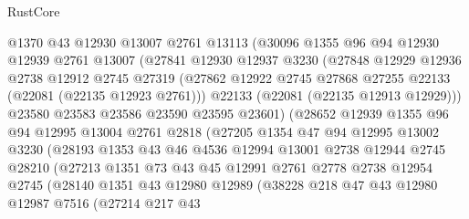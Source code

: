\begin{lexlean}{RustCore}
\begin{coremodule}
                @1370
                @43
                @12930
                @13007
                @2761
                @13113
                (@30096
                  @1355
                  @96
                  @94
                  @12930
                  @12939
                  @2761
                  @13007
                  (@27841
                    @12930
                    @12937
                    @3230
                    (@27848
                      @12929
                      @12936
                      @2738
                      @12912
                      @2745
                      @27319
                      (@27862 @12922 @2745 @27868 @27255 @22133 (@22081 (@22135 @12923 @2761)))
                      @22133
                      (@22081 (@22135 @12913 @12929)))
                    @23580
                    @23583
                    @23586
                    @23590
                    @23595
                    @23601)
                  (@28652
                    @12939
                    @1355
                    @96
                    @94
                    @12995
                    @13004
                    @2761
                    @2818
                    (@27205
                      @1354
                      @47
                      @94
                      @12995
                      @13002
                      @3230
                      (@28193
                        @1353
                        @43
                        @46
                        @4536
                        @12994
                        @13001
                        @2738
                        @12944
                        @2745
                        @28210
                        (@27213
                          @1351
                          @73
                          @43
                          @45
                          @12991
                          @2761
                          @2778
                          @2738
                          @12954
                          @2745
                          (@28140
                            @1351
                            @43
                            @12980
                            @12989
                            (@38228
                              @218
                              @47
                              @43
                              @12980
                              @12987
                              @7516
                              (@27214
                                @217
                                @43

\end{coremodule}
\end{lexlean}
